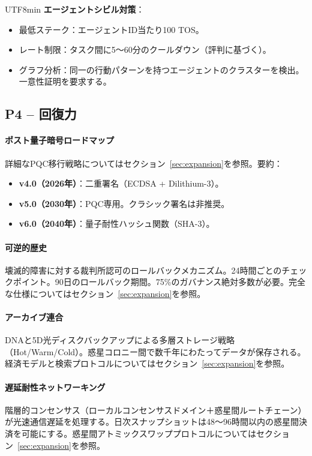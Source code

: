 \documentclass[11pt]{article}
\begin{document}
\begin{CJK}{UTF8}{min}
\textbf{エージェントシビル対策}：
\begin{itemize}[noitemsep]
  \item 最低ステーク：エージェントID当たり100 TOS。
  \item レート制限：タスク間に5〜60分のクールダウン（評判に基づく）。
  \item グラフ分析：同一の行動パターンを持つエージェントのクラスターを検出。一意性証明を要求する。
\end{itemize}

\subsection{P4 -- 回復力}
\label{sec:pillar-resilience}

\paragraph{ポスト量子暗号ロードマップ}
詳細なPQC移行戦略についてはセクション~\ref{sec:expansion}を参照。要約：
\begin{itemize}[noitemsep]
  \item \textbf{v4.0（2026年）}：二重署名（ECDSA + Dilithium-3）。
  \item \textbf{v5.0（2030年）}：PQC専用。クラシック署名は非推奨。
  \item \textbf{v6.0（2040年）}：量子耐性ハッシュ関数（SHA-3）。
\end{itemize}

\paragraph{可逆的歴史}
壊滅的障害に対する裁判所認可のロールバックメカニズム。24時間ごとのチェックポイント。90日のロールバック期間。75\%のガバナンス絶対多数が必要。完全な仕様についてはセクション~\ref{sec:expansion}を参照。

\paragraph{アーカイブ連合}
DNAと5D光ディスクバックアップによる多層ストレージ戦略（Hot/Warm/Cold）。惑星コロニー間で数千年にわたってデータが保存される。経済モデルと検索プロトコルについてはセクション~\ref{sec:expansion}を参照。

\paragraph{遅延耐性ネットワーキング}
階層的コンセンサス（ローカルコンセンサスドメイン＋惑星間ルートチェーン）が光速通信遅延を処理する。日次スナップショットは48〜96時間以内の惑星間決済を可能にする。惑星間アトミックスワッププロトコルについてはセクション~\ref{sec:expansion}を参照。


\end{CJK}
\end{document}
